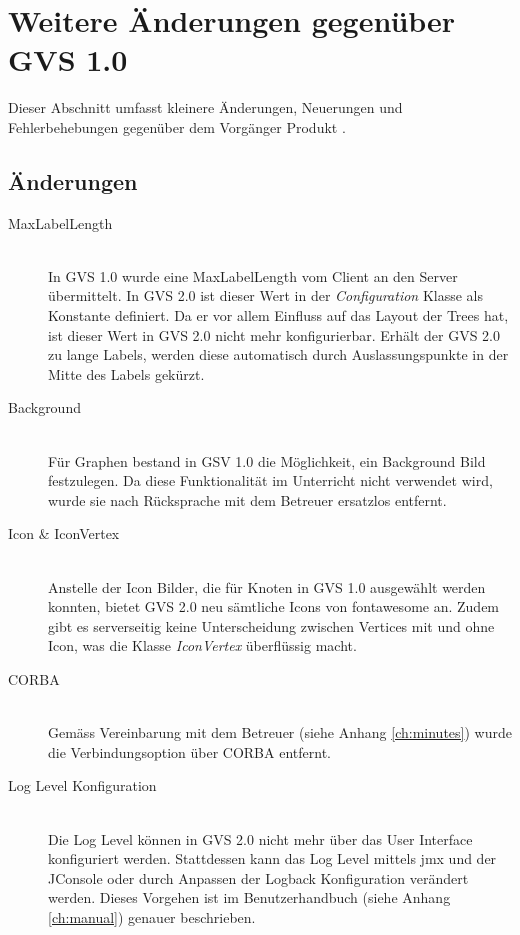 \documentclass[11pt,a4paper,english,oneside]{book}
\numberwithin{equation}{chapter}
\begin{document}
	\section{Weitere Änderungen gegenüber GVS 1.0}
	Dieser Abschnitt umfasst kleinere Änderungen, Neuerungen und Fehlerbehebungen gegenüber dem Vorgänger Produkt \cite{gvs1}.
	
	\subsection{Änderungen}
	\begin{description}
		\item[MaxLabelLength] \hfill \\
		In GVS 1.0 wurde eine MaxLabelLength vom Client an den Server übermittelt. In GVS 2.0 ist dieser Wert in der \textit{Configuration} Klasse als Konstante definiert. Da er vor allem Einfluss auf das Layout der Trees hat, ist dieser Wert in GVS 2.0 nicht mehr konfigurierbar. Erhält der GVS 2.0 zu lange Labels, werden diese automatisch durch Auslassungspunkte in der Mitte des Labels gekürzt.
		\item[Background] \hfill \\ 
		Für Graphen bestand in GSV 1.0 die Möglichkeit, ein Background Bild festzulegen. Da diese Funktionalität im Unterricht nicht verwendet wird, wurde sie nach Rücksprache mit dem Betreuer ersatzlos entfernt.
		\item[Icon \& IconVertex] \hfill \\
		Anstelle der Icon Bilder, die für Knoten in GVS 1.0 ausgewählt werden konnten, bietet GVS 2.0 neu sämtliche Icons von \gls{fontawesome} \cite{fontawesome} an. Zudem gibt es serverseitig keine Unterscheidung zwischen Vertices mit und ohne Icon, was die Klasse \textit{IconVertex} überflüssig macht.
		\item[CORBA] \hfill \\
		Gemäss Vereinbarung mit dem Betreuer (siehe Anhang \ref{ch:minutes}) wurde die Verbindungsoption über CORBA entfernt.
		\item[Log Level Konfiguration] \hfill \\
		Die Log Level können in GVS 2.0 nicht mehr über das User Interface konfiguriert werden. Stattdessen kann das Log Level mittels \gls{jmx} und der JConsole oder durch Anpassen der Logback Konfiguration verändert werden. Dieses Vorgehen ist im Benutzerhandbuch (siehe Anhang \ref{ch:manual}) genauer beschrieben.
	\end{description}
\end{document}
